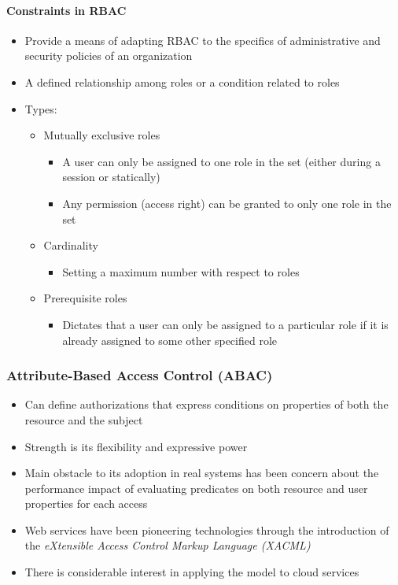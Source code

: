 \paragraph{Constraints in RBAC}
\begin{itemize}
    \item Provide a means of adapting RBAC to the specifics of administrative and security policies of an organization
    \item A defined relationship among roles or a condition related to roles
    \item Types:
    \begin{itemize}
        \item Mutually exclusive roles
        \begin{itemize}
            \item A user can only be assigned to one role in the set (either during a session or statically)
            \item Any permission (access right) can be granted to only one role in the set
        \end{itemize}
        \item Cardinality
        \begin{itemize}
            \item Setting a maximum number with respect to roles
        \end{itemize}
        \item Prerequisite roles
        \begin{itemize}
            \item Dictates that a user can only be assigned to a particular role if it is already assigned to some other specified role
        \end{itemize}
    \end{itemize}
\end{itemize}

\newpage

\subsubsection{Attribute-Based Access Control (ABAC)}
\begin{itemize}
    \item Can define authorizations that express conditions on properties of both the resource and the subject
    \item Strength is its flexibility and expressive power
    \item Main obstacle to its adoption in real systems has been concern about the performance impact of evaluating predicates on both resource and user properties for each access
    \item Web services have been pioneering technologies through the introduction of the \textit{eXtensible Access Control Markup Language (XACML)}
    \item There is considerable interest in applying the model to cloud services
\end{itemize}

